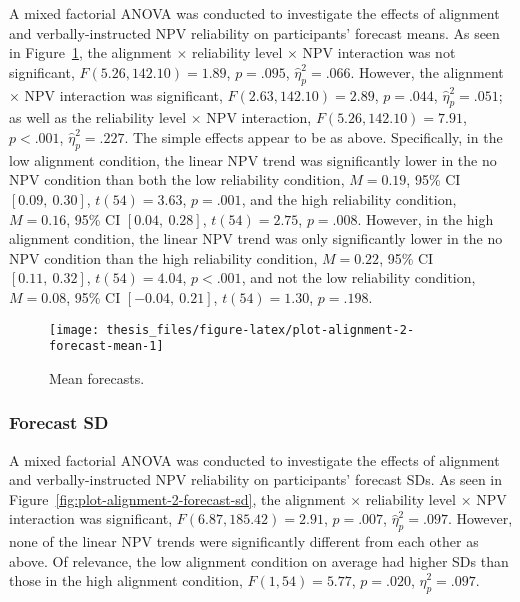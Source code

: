 \documentclass[a4paper, nobind]{templates/ociamthesis}
\theoremstyle{definition}
\theoremstyle{definition}
\theoremstyle{definition}
\theoremstyle{definition}
\theoremstyle{remark}
\begin{document}
A mixed factorial ANOVA was conducted to investigate the effects of alignment
and verbally-instructed NPV reliability on participants' forecast means. As seen
in Figure~\ref{fig:plot-alignment-2-forecast-mean}, the alignment \(\times\)
reliability level \(\times\) NPV interaction was not significant,
\(F(5.26, 142.10) = 1.89\), \(p = .095\), \(\hat{\eta}^2_p = .066\).
However, the alignment \(\times\) NPV interaction was significant,
\(F(2.63, 142.10) = 2.89\), \(p = .044\), \(\hat{\eta}^2_p = .051\); as well as the
reliability level \(\times\) NPV interaction,
\(F(5.26, 142.10) = 7.91\), \(p < .001\), \(\hat{\eta}^2_p = .227\). The simple
effects appear to be as above. Specifically, in the low alignment condition, the
linear NPV trend was significantly lower in the no NPV condition than both the
low reliability condition,
\(M = 0.19\), 95\% CI \([0.09,~0.30]\), \(t(54) = 3.63\), \(p = .001\), and the high
reliability condition,
\(M = 0.16\), 95\% CI \([0.04,~0.28]\), \(t(54) = 2.75\), \(p = .008\). However, in the
high alignment condition, the linear NPV trend was only significantly lower in
the no NPV condition than the high reliability condition,
\(M = 0.22\), 95\% CI \([0.11,~0.32]\), \(t(54) = 4.04\), \(p < .001\), and not the low
reliability condition,
\(M = 0.08\), 95\% CI \([-0.04,~0.21]\), \(t(54) = 1.30\), \(p = .198\).



\begin{figure}
\texttt{[image: thesis\_files/figure-latex/plot-alignment-2-forecast-mean-1]} \caption{Mean forecasts.}\label{fig:plot-alignment-2-forecast-mean}
\end{figure}

\hypertarget{forecast-sd-alignment-2}{%
\subsubsection{Forecast SD}\label{forecast-sd-alignment-2}}

A mixed factorial ANOVA was conducted to investigate the effects of alignment
and verbally-instructed NPV reliability on participants' forecast SDs. As seen
in Figure~\ref{fig:plot-alignment-2-forecast-sd}, the alignment \(\times\)
reliability level \(\times\) NPV interaction was significant,
\(F(6.87, 185.42) = 2.91\), \(p = .007\), \(\hat{\eta}^2_p = .097\).
However, none of the linear NPV trends were significantly different from each
other as above. Of relevance, the low alignment condition on average had higher
SDs than those in the high alignment condition,
\(F(1, 54) = 5.77\), \(p = .020\), \(\hat{\eta}^2_p = .097\).
\end{document}
